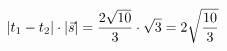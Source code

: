\documentclass[preview]{standalone}
\begin{document}
\begin{align*}
\special{dvisvgm:raw <g id='unique000'>}|t_1-t_2|\cdot|\vec s|=\dfrac{2\sqrt{10}}{3}\cdot\sqrt{3}=2\sqrt{\dfrac{10}{3}}\special{dvisvgm:raw </g>}
\end{align*}
\end{document}
